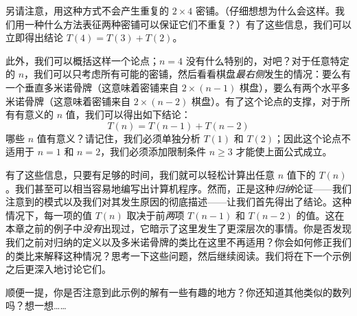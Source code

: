 另请注意，用这种方式不会产生重复的 $2 \times 4$ 密铺。（仔细想想为什么会这样。我们用一种什么方法表征两种密铺可以保证它们不重复？）有了这些信息，我们可以立即得出结论 $T(4) = T(3) + T(2)$。

此外，我们可以概括这样一个论点；$n = 4$ 没有什么特别的，对吧？对于任意特定的 $n$，我们可以只考虑所有可能的密铺，然后看看棋盘\emph{最右侧}发生的情况：要么有一个垂直多米诺骨牌（这意味着密铺来自 $2 \times (n - 1)$ 棋盘），要么有两个水平多米诺骨牌（这意味着密铺来自 $2 \times (n-2)$ 棋盘）。有了这个论点的支撑，对于所有有意义的 $n$ 值，我们可以得出如下结论：
\[T(n) = T(n - 1) + T(n - 2)\]
哪些 $n$ 值有意义？请记住，我们必须单独分析 $T(1)$ 和 $T(2)$；因此这个论点不适用于 $n=1$ 和 $n=2$，我们必须添加限制条件 $n \ge 3$ 才能使上面公式成立。

有了这些信息，只要有足够的时间，我们就可以轻松计算出任意 $n$ 值下的 $T(n)$。我们甚至可以相当容易地编写出计算机程序。然而，正是这种\emph{归纳}论证——我们注意到的模式以及我们对其发生原因的彻底描述——让我们首先得出了结论。这种情况下，每一项的值 $T(n)$ 取决于前\emph{两}项 $T(n-1)$ 和 $T(n-2)$ 的值。这在本章之前的例子中\emph{没有}出现过，它暗示了这里发生了更深层次的事情。你是否发现我们之前对归纳的定义以及多米诺骨牌的类比在这里不再适用？你会如何修正我们的类比来解释这种情况？思考一下这些问题，然后继续阅读。我们将在下一个示例之后更深入地讨论它们。

顺便一提，你是否注意到此示例的解有一些有趣的地方？你还知道其他类似的数列吗？想一想……

